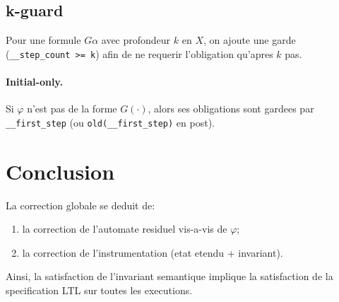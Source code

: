\documentclass[11pt]{article}
\theoremstyle{definition}
\begin{document}
\subsection{k-guard}
Pour une formule $G\alpha$ avec profondeur $k$ en $X$, on ajoute une garde
(\texttt{\_\_step\_count >= k}) afin de ne requerir l'obligation qu'apres $k$ pas.

\paragraph{Initial-only.}
Si $\varphi$ n'est pas de la forme $G(\cdot)$, alors ses obligations
sont gardees par \texttt{\_\_first\_step} (ou \texttt{old(\_\_first\_step)} en post).

\section{Conclusion}
La correction globale se deduit de:
\begin{enumerate}
\item la correction de l'automate residuel vis-a-vis de $\varphi$;
\item la correction de l'instrumentation (etat etendu + invariant).
\end{enumerate}
Ainsi, la satisfaction de l'invariant semantique implique la satisfaction
de la specification LTL sur toutes les executions.
\end{document}
